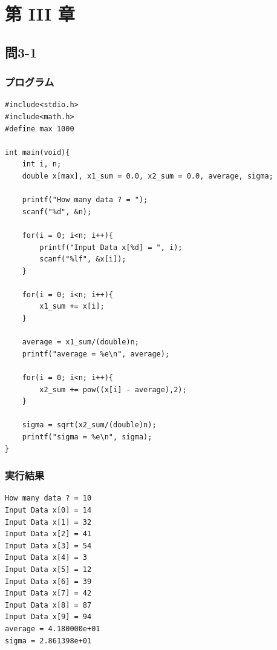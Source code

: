 \documentclass{jarticle}
\begin{document}
\section{第 III 章\\}
\subsection{問3-1\\}
\subsubsection{プログラム\\}
\begin{breakbox}
\begin{verbatim}
#include<stdio.h>
#include<math.h>
#define max 1000

int main(void){
    int i, n;
    double x[max], x1_sum = 0.0, x2_sum = 0.0, average, sigma;

    printf("How many data ? = ");
    scanf("%d", &n);

    for(i = 0; i<n; i++){
        printf("Input Data x[%d] = ", i);
        scanf("%lf", &x[i]);
    }

    for(i = 0; i<n; i++){
        x1_sum += x[i];
    }

    average = x1_sum/(double)n;
    printf("average = %e\n", average);
    
    for(i = 0; i<n; i++){
        x2_sum += pow((x[i] - average),2);
    }

    sigma = sqrt(x2_sum/(double)n);
    printf("sigma = %e\n", sigma);
}
\end{verbatim}
\end{breakbox}
\subsubsection{実行結果\\}
\begin{breakbox}
\begin{verbatim}
How many data ? = 10
Input Data x[0] = 14
Input Data x[1] = 32
Input Data x[2] = 41
Input Data x[3] = 54
Input Data x[4] = 3
Input Data x[5] = 12
Input Data x[6] = 39
Input Data x[7] = 42
Input Data x[8] = 87
Input Data x[9] = 94
average = 4.180000e+01
sigma = 2.861398e+01
\end{verbatim}
\end{breakbox}
\end{document}

